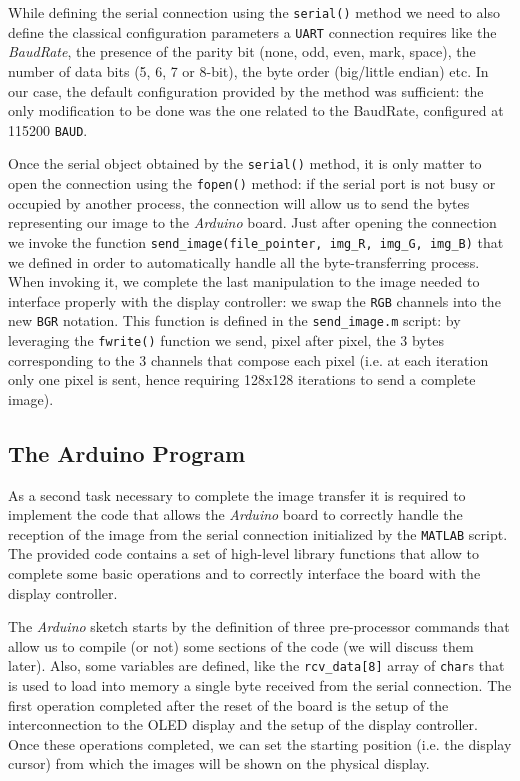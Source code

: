 \documentclass[a4paper]{article}
\begin{document}
            While defining the serial connection using the \texttt{serial()} method we need to also define the classical configuration parameters a \texttt{UART} connection requires like the \emph{BaudRate}, the presence of the parity bit (none, odd, even, mark, space), the number of data bits (5, 6, 7 or 8-bit), the byte order (big/little endian) etc. In our case, the default configuration provided by the method was sufficient: the only modification to be done was the one related to the BaudRate, configured at 115200 \texttt{BAUD}.

            Once the serial object obtained by the \texttt{serial()} method, it is only matter to open the connection using the \texttt{fopen()} method: if the serial port is not busy or occupied by another process, the connection will allow us to send the bytes representing our image to the \emph{Arduino} board.
            Just after opening the connection we invoke the function \texttt{send\_image(file\_pointer, img\_R, img\_G, img\_B)} that we defined in order to automatically handle all the byte-transferring process.
            When invoking it, we complete the last manipulation to the image needed to interface properly with the display controller: we swap the \texttt{RGB} channels into the new \texttt{BGR} notation.
            This function is defined in the \texttt{send\_image.m} script: by leveraging the \texttt{fwrite()} function we send, pixel after pixel, the 3 bytes corresponding to the 3 channels that compose each pixel (i.e. at each iteration only one pixel is sent, hence requiring 128x128 iterations to send a complete image).

    \subsection{The Arduino Program}
        As a second task necessary to complete the image transfer it is required to implement the code that allows the \emph{Arduino} board to correctly handle the reception of the image from the serial connection initialized by the \texttt{MATLAB} script. 
        The provided code contains a set of high-level library functions that allow to complete some basic operations and to correctly interface the board with the display controller.

        The \emph{Arduino} sketch starts by the definition of three pre-processor commands that allow us to compile (or not) some sections of the code (we will discuss them later).
        Also, some variables are defined, like the \texttt{rcv\_data[8]} array of \texttt{char}s that is used to load into memory a single byte received from the serial connection.
        The first operation completed after the reset of the board is the setup of the interconnection to the OLED display and the setup of the display controller. Once these operations completed, we can set the starting position (i.e. the display cursor) from which the images will be shown on the physical display.
\end{document}
